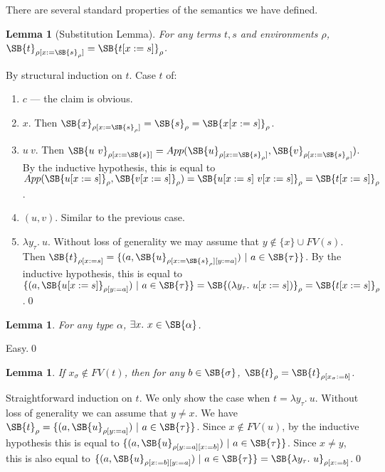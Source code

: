\documentclass{LMCS}
\newtheorem{lemma}[thm]{Lemma}
\newcommand{\sr}[1]{\SB{#1}_\rho}
\begin{document}
There are several standard properties of the semantics we have defined. 

\begin{lemma}[Substitution Lemma]
For any terms $t, s$ and environments $\rho$,  $\SB{t}_{\rho[x:=\SB{s}_\rho]} = \SB{t[x:=s]}_\rho$. 
\end{lemma}
\proof
By structural induction on $t$. Case $t$ of:
\begin{enumerate}[$\bullet$]
\item $c$ --- the claim is obvious. 
\item $x$. Then $\SB{x}_{\rho[x:=\SB{s}_\rho]} = \SB{s}_\rho =
\SB{x[x:=s]}_\rho$. 
\item $u\ v$. Then $\SB{u\ v}_{\rho[x:=\SB{s}]} =
App(\SB{u}_{\rho[x:=\SB{s}_\rho]}, \SB{v}_{\rho[x:=\SB{s}_\rho]})$. By the inductive
hypothesis, this is equal to $App(\SB{u[x:=s]}_\rho, \SB{v[x:=s]}_\rho) = \SB{u[x:=s]\
v[x:=s]}_\rho = \SB{t[x:=s]}_\rho$. 
\item $(u, v)$. Similar to the previous case. 
\item $\lambda y_\tau.\ u$. Without loss of generality we may assume that $y
\notin \{ x \} \cup FV(s)$. Then $\SB{t}_{\rho[x:=s]} = \{ (a,
\SB{u}_{\rho[x:=\SB{s}_\rho][y:=a]})\ |\ a \in \SB{\tau} \}$. By the inductive
hypothesis, this is equal to $\{ (a, \SB{u[x:=s]}_{\rho[y:=a]})\ |\ a \in
\SB{\tau} \} = \SB{(\lambda y_\tau.\ u[x:=s])}_\rho = \SB{t[x:=s]}_\rho$.\qed
\end{enumerate}

\begin{lemma}\label{typesnotempty}
For any type $\alpha$, $\exists x.\ x \in \SB{\alpha}$.
\end{lemma}
\proof
Easy.\qed

\begin{lemma}\label{fvfv}
If $x_\sigma \notin FV(t)$, then for any $b \in \SB{\sigma}$, $\sr{t} = \SB{t}_{\rho[x_\sigma:=b]}$.
\end{lemma}
\proof
Straightforward induction on $t$. We only show the case when $t = \lambda
y_\tau.\ u$. Without loss of generality we can assume that $y \neq x$. 
We have $\sr{t} = \{ (a, \SB{u}_{\rho[y:=a]})\ |\ a \in \SB{\tau} \}$. Since
$x \notin FV(u)$, by the inductive hypothesis this is equal to
$\{ (a, \SB{u}_{\rho[y:=a][x:=b]})\ |\ a \in \SB{\tau} \}$. Since $x \neq
y$, this is also equal to $\{ (a, \SB{u}_{\rho[x:=b][y:=a]})\ |\ a \in
\SB{\tau} \} = \SB{\lambda y_\tau.\ u}_{\rho[x:=b]}$.\qed
\end{document}

